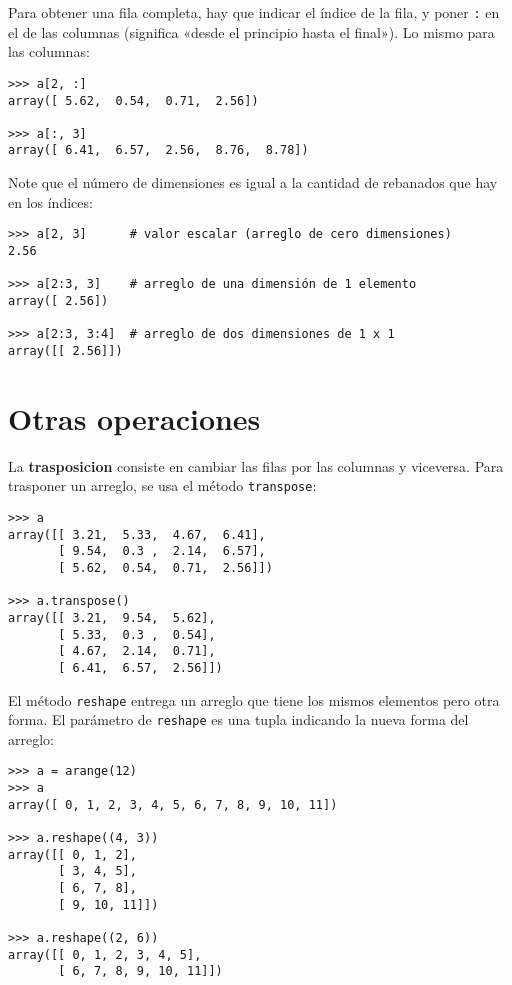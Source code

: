 Para obtener una fila completa, hay que indicar el índice de la fila, y
poner \lstinline!:! en el de las columnas (significa «desde el principio
hasta el final»). Lo mismo para las columnas:

\begin{lstlisting}
>>> a[2, :]
array([ 5.62,  0.54,  0.71,  2.56])

>>> a[:, 3]
array([ 6.41,  6.57,  2.56,  8.76,  8.78])
\end{lstlisting}

Note que el número de dimensiones es igual a la cantidad de rebanados
que hay en los índices:

\begin{lstlisting}
>>> a[2, 3]      # valor escalar (arreglo de cero dimensiones)
2.56

>>> a[2:3, 3]    # arreglo de una dimensión de 1 elemento
array([ 2.56])

>>> a[2:3, 3:4]  # arreglo de dos dimensiones de 1 x 1
array([[ 2.56]])
\end{lstlisting}

\section{Otras operaciones}

La \textbf{trasposicion} consiste en cambiar las filas por las columnas
y viceversa. Para trasponer un arreglo, se usa el método
\lstinline!transpose!:

\begin{lstlisting}
>>> a
array([[ 3.21,  5.33,  4.67,  6.41],
       [ 9.54,  0.3 ,  2.14,  6.57],
       [ 5.62,  0.54,  0.71,  2.56]])

>>> a.transpose()
array([[ 3.21,  9.54,  5.62],
       [ 5.33,  0.3 ,  0.54],
       [ 4.67,  2.14,  0.71],
       [ 6.41,  6.57,  2.56]])
\end{lstlisting}

El método \lstinline!reshape! entrega un arreglo que tiene los mismos
elementos pero otra forma. El parámetro de \lstinline!reshape! es una
tupla indicando la nueva forma del arreglo:

\begin{lstlisting}
>>> a = arange(12)
>>> a
array([ 0, 1, 2, 3, 4, 5, 6, 7, 8, 9, 10, 11])

>>> a.reshape((4, 3))
array([[ 0, 1, 2],
       [ 3, 4, 5],
       [ 6, 7, 8],
       [ 9, 10, 11]])

>>> a.reshape((2, 6))
array([[ 0, 1, 2, 3, 4, 5],
       [ 6, 7, 8, 9, 10, 11]])
\end{lstlisting}

